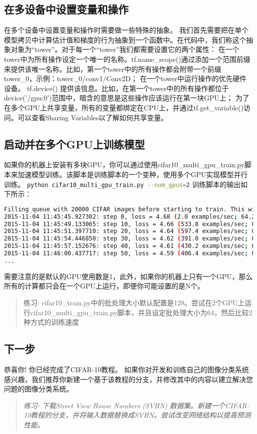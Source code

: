 \subsection{在多设备中设置变量和操作}
在多个设备中设置变量和操作时需要做一些特殊的抽象。
我们首先需要把在单个模型拷贝中计算估计值和梯度的行为抽象到一个函数中。在代码中，我们称这个抽象对象为“tower”。对于每一个“tower”我们都需要设置它的两个属性：
在一个tower中为所有操作设定一个唯一的名称。tf.name\_scope()通过添加一个范围前缀来提供该唯一名称。比如，第一个tower中的所有操作都会附带一个前缀tower\_0，示例：tower\_0/conv1/Conv2D；
在一个tower中运行操作的优先硬件设备。 tf.device() 提供该信息。比如，在第一个tower中的所有操作都位于 device('/gpu:0')范围中，暗含的意思是这些操作应该运行在第一块GPU上；
为了在多个GPU上共享变量，所有的变量都绑定在CPU上，并通过tf.get\_variable()访问。可以查看Sharing Variables以了解如何共享变量。

\subsection{启动并在多个GPU上训练模型}
如果你的机器上安装有多块GPU，你可以通过使用cifar10\_multi\_gpu\_train.py脚本来加速模型训练。该脚本是训练脚本的一个变种，使用多个GPU实现模型并行训练。
\lstinline[language=Bash]{python cifar10_multi_gpu_train.py --num_gpus=2}
训练脚本的输出如下所示：

\begin{lstlisting}[language=Bash]
Filling queue with 20000 CIFAR images before starting to train. This will take a few minutes.
2015-11-04 11:45:45.927302: step 0, loss = 4.68 (2.0 examples/sec; 64.221 sec/batch)
2015-11-04 11:45:49.133065: step 10, loss = 4.66 (533.8 examples/sec; 0.240 sec/batch)
2015-11-04 11:45:51.397710: step 20, loss = 4.64 (597.4 examples/sec; 0.214 sec/batch)
2015-11-04 11:45:54.446850: step 30, loss = 4.62 (391.0 examples/sec; 0.327 sec/batch)
2015-11-04 11:45:57.152676: step 40, loss = 4.61 (430.2 examples/sec; 0.298 sec/batch)
2015-11-04 11:46:00.437717: step 50, loss = 4.59 (406.4 examples/sec; 0.315 sec/batch)
...
\end{lstlisting}

需要注意的是默认的GPU使用数是1，此外，如果你的机器上只有一个GPU，那么所有的计算都只会在一个GPU上运行，即便你可能设置的是N个。

\begin{quote}
练习: cifar10\_train.py中的批处理大小默认配置是128。尝试在2个GPU上运行cifar10\_multi\_gpu\_train.py脚本，并且设定批处理大小为64，然后比较2种方式的训练速度
\end{quote}

\subsection{下一步}
恭喜你! 你已经完成了CIFAR-10教程。 如果你对开发和训练自己的图像分类系统感兴趣，我们推荐你新建一个基于该教程的分支，并修改其中的内容以建立解决您问题的图像分类系统。
\begin{quote}
\emph{练习: 下载Street View House Numbers (SVHN) 数据集。新建一个CIFAR-10教程的分支，并将输入数据替换成SVHN。尝试改变网络结构以提高预测性能。}
\end{quote}
